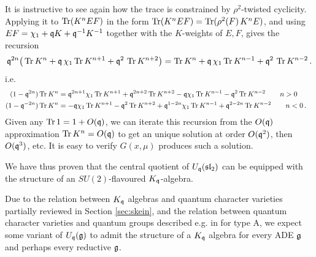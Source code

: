 \documentclass[12pt]{amsart}
\begin{document}
It is instructive to see again how the trace is constrained by $\rho^2$-twisted cyclicity. Applying it to $\operatorname{Tr}(K^n E F)$
in the form $\operatorname{Tr}(K^n E F)=\operatorname{Tr}(\rho^2(F)\,K^n E)$, and using $EF=\chi_1+\mathfrak{q} K+\mathfrak{q}^{-1}K^{-1}$ together with the $K$-weights of $E,F$,
gives the recursion
\begin{equation}\label{eq:uqsl2rec}
	\mathfrak{q}^{2n}\big(\operatorname{Tr} K^n + \mathfrak{q}\,\chi_1\operatorname{Tr} K^{n+1} + \mathfrak{q}^{2}\,\operatorname{Tr} K^{n+2}\big)
	= \operatorname{Tr} K^n + \mathfrak{q}\,\chi_1\operatorname{Tr} K^{n-1} + \mathfrak{q}^{2}\,\operatorname{Tr} K^{n-2} \, .
\end{equation}
i.e. 
\begin{align}\label{eq:uqsl2con}
	(1-\mathfrak{q}^{2n}) \operatorname{Tr} K^n &= \mathfrak{q}^{2n+1}\chi_1\operatorname{Tr} K^{n+1} + \mathfrak{q}^{2n+2}\operatorname{Tr} K^{n+2} -  \mathfrak{q}\chi_1\operatorname{Tr} K^{n-1} - \mathfrak{q}^{2}\operatorname{Tr} K^{n-2} \qquad n>0 \cr
	(1-\mathfrak{q}^{-2n}) \operatorname{Tr} K^n &= -\mathfrak{q} \chi_1\operatorname{Tr} K^{n+1} - \mathfrak{q}^{2}\operatorname{Tr} K^{n+2} +  \mathfrak{q}^{1-2n} \chi_1\operatorname{Tr} K^{n-1} + \mathfrak{q}^{2-2n}\operatorname{Tr} K^{n-2} \qquad n<0  \, .
\end{align}
Given any $\operatorname{Tr} 1 = 1 + O(\mathfrak{q})$, we can iterate this recursion from the $O(\mathfrak{q})$ approximation $\operatorname{Tr} K^n = O(\mathfrak{q})$ to get an unique solution at order $O(\mathfrak{q}^2)$, then $O(\mathfrak{q}^3)$, etc. It is easy to verify $G(x,\mu)$ produces such a solution. 

We have thus proven that the central quotient of $U_{\mathfrak{q}}(\mathfrak{sl}_2)$ can be equipped with the structure of an $SU(2)$-flavoured $K_{\mathfrak{q}}$-algebra.

\begin{remark} Due to the relation between $K_{\mathfrak{q}}$ algebras and quantum character varieties partially reviewed in Section \ref{sec:skein}, and the relation between 
quantum character varieties and quantum groups described e.g. in \cite{Gaiotto:2014lma,schrader2019clusterrealizationuqmathfrakslnquantum} for type A, we expect some variant of $U_{\mathfrak{q}}(\mathfrak{g})$ 
to admit the structure of a $K_{\mathfrak{q}}$ algebra for every ADE $\mathfrak{g}$ and perhaps every reductive $\mathfrak{g}$.  \end{remark}
\end{document}
